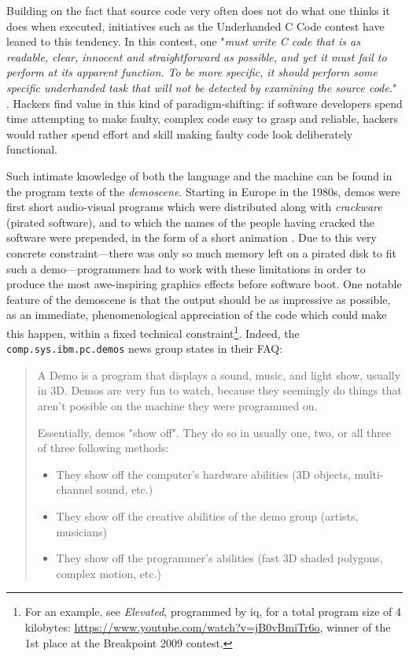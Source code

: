 Building on the fact that source code very often does not do what one thinks it does when executed, initiatives such as the Underhanded C Code contest have leaned to this tendency. In this contest, one "\emph{must write C code that is as readable, clear, innocent and straightforward as possible, and yet it must fail to perform at its apparent function. To be more specific, it should perform some specific underhanded task that will not be detected by examining the source code.}" \citep{craver_underhanded_2015}. Hackers find value in this kind of paradigm-shifting: if software developers spend time attempting to make faulty, complex code easy to grasp and reliable, hackers would rather spend effort and skill making faulty code look deliberately functional.

Such intimate knowledge of both the language and the machine can be found in the program texts of the \emph{demoscene}. Starting in Europe in the 1980s, demos were first short audio-visual programs which were distributed along with \emph{crackware} (pirated software), and to which the names of the people having cracked the software were prepended, in the form of a short animation \citep{reunanen_computer_2010}. Due to this very concrete constraint—there was only so much memory left on a pirated disk to fit such a demo—programmers had to work with these limitations in order to produce the most awe-inspiring graphics effects before software boot. One notable feature of the demoscene is that the output should be as impressive as possible, as an immediate, phenomenological appreciation of the code which could make this happen, within a fixed technical constraint\footnote{For an example, see \emph{Elevated}, programmed by iq, for a total program size of 4 kilobytes: \url{https://www.youtube.com/watch?v=jB0vBmiTr6o}, winner of the 1st place at the Breakpoint 2009 contest.}. Indeed, the \lstinline{comp.sys.ibm.pc.demos} news group states in their FAQ:

\begin{quote}
  A Demo is a program that displays a sound, music, and light show, usually in 3D. Demos are very fun to watch, because they seemingly do things that aren't possible on the machine they were programmed on.

  Essentially, demos "show off". They do so in usually one, two, or all three of three following methods:

  \begin{itemize}
    \item{They show off the computer's hardware abilities (3D objects, multi-channel sound, etc.)}
    \item{They show off the creative abilities of the demo group (artists, musicians)}
    \item{They show off the programmer's abilities (fast 3D shaded polygons, complex motion, etc.)}
  \end{itemize}
  \citep{melik_pc_2012}
\end{quote}

